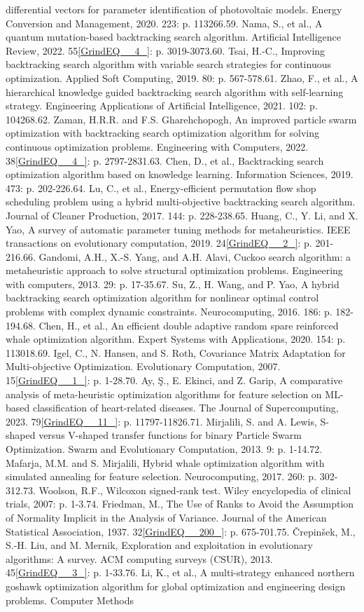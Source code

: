 \documentclass{article} %
\begin{document}
differential vectors for parameter identification of photovoltaic models. Energy Conversion and Management, 2020. 223: p. 113266.59. Nama, S., et al., A quantum mutation-based backtracking search algorithm. Artificial Intelligence Review, 2022. 55\eqref{GrindEQ__4_}: p. 3019-3073.60. Tsai, H.-C., Improving backtracking search algorithm with variable search strategies for continuous optimization. Applied Soft Computing, 2019. 80: p. 567-578.61. Zhao, F., et al., A hierarchical knowledge guided backtracking search algorithm with self-learning strategy. Engineering Applications of Artificial Intelligence, 2021. 102: p. 104268.62. Zaman, H.R.R. and F.S. Gharehchopogh, An improved particle swarm optimization with backtracking search optimization algorithm for solving continuous optimization problems. Engineering with Computers, 2022. 38\eqref{GrindEQ__4_}: p. 2797-2831.63. Chen, D., et al., Backtracking search optimization algorithm based on knowledge learning. Information Sciences, 2019. 473: p. 202-226.64. Lu, C., et al., Energy-efficient permutation flow shop scheduling problem using a hybrid multi-objective backtracking search algorithm. Journal of Cleaner Production, 2017. 144: p. 228-238.65. Huang, C., Y. Li, and X. Yao, A survey of automatic parameter tuning methods for metaheuristics. IEEE transactions on evolutionary computation, 2019. 24\eqref{GrindEQ__2_}: p. 201-216.66. Gandomi, A.H., X.-S. Yang, and A.H. Alavi, Cuckoo search algorithm: a metaheuristic approach to solve structural optimization problems. Engineering with computers, 2013. 29: p. 17-35.67. Su, Z., H. Wang, and P. Yao, A hybrid backtracking search optimization algorithm for nonlinear optimal control problems with complex dynamic constraints. Neurocomputing, 2016. 186: p. 182-194.68. Chen, H., et al., An efficient double adaptive random spare reinforced whale optimization algorithm. Expert Systems with Applications, 2020. 154: p. 113018.69. Igel, C., N. Hansen, and S. Roth, Covariance Matrix Adaptation for Multi-objective Optimization. Evolutionary Computation, 2007. 15\eqref{GrindEQ__1_}: p. 1-28.70. Ay, \c{S}., E. Ekinci, and Z. Garip, A comparative analysis of meta-heuristic optimization algorithms for feature selection on ML-based classification of heart-related diseases. The Journal of Supercomputing, 2023. 79\eqref{GrindEQ__11_}: p. 11797-11826.71. Mirjalili, S. and A. Lewis, S-shaped versus V-shaped transfer functions for binary Particle Swarm Optimization. Swarm and Evolutionary Computation, 2013. 9: p. 1-14.72. Mafarja, M.M. and S. Mirjalili, Hybrid whale optimization algorithm with simulated annealing for feature selection. Neurocomputing, 2017. 260: p. 302-312.73. Woolson, R.F., Wilcoxon signed‐rank test. Wiley encyclopedia of clinical trials, 2007: p. 1-3.74. Friedman, M., The Use of Ranks to Avoid the Assumption of Normality Implicit in the Analysis of Variance. Journal of the American Statistical Association, 1937. 32\eqref{GrindEQ__200_}: p. 675-701.75. \v{C}repin\v{s}ek, M., S.-H. Liu, and M. Mernik, Exploration and exploitation in evolutionary algorithms: A survey. ACM computing surveys (CSUR), 2013. 45\eqref{GrindEQ__3_}: p. 1-33.76. Li, K., et al., A multi-strategy enhanced northern goshawk optimization algorithm for global optimization and engineering design problems. Computer Methods 
\end{document}
